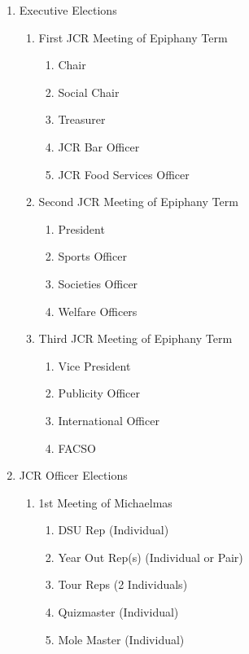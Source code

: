 \begin{enumerate}
    \item Executive Elections
    \begin{enumerate}
        \item First JCR Meeting of Epiphany Term
        \begin{enumerate}
            \item Chair
            \item Social Chair
            \item Treasurer
            \item JCR Bar Officer 
            \item JCR Food Services Officer
        \end{enumerate}
        \item Second JCR Meeting of Epiphany Term
        \begin{enumerate}
            \item President
            \item Sports Officer 
            \item Societies Officer 
            \item Welfare Officers
        \end{enumerate}
        \item Third JCR Meeting of Epiphany Term
        \begin{enumerate}
            \item Vice President 
            \item Publicity Officer 
            \item International Officer 
            \item FACSO
        \end{enumerate}
    \end{enumerate}
    \item JCR Officer Elections
    \begin{enumerate}
        \item 1st Meeting of Michaelmas
        \begin{enumerate}
            \item DSU Rep (Individual)
            \item Year Out Rep(s) (Individual or Pair) 
            \item Tour Reps (2 Individuals) 
            \item Quizmaster (Individual)
            \item Mole Master (Individual)

\end{enumerate}
\end{enumerate}
\end{enumerate}
